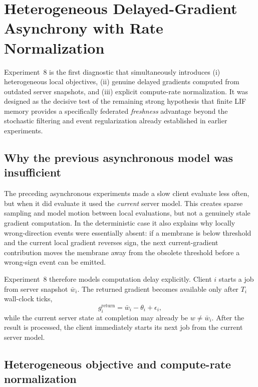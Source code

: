\section{Heterogeneous Delayed-Gradient Asynchrony with Rate Normalization}

Experiment~8 is the first diagnostic that simultaneously introduces (i) heterogeneous local objectives, (ii) genuine delayed gradients computed from outdated server snapshots, and (iii) explicit compute-rate normalization. It was designed as the decisive test of the remaining strong hypothesis that finite LIF memory provides a specifically federated \emph{freshness} advantage beyond the stochastic filtering and event regularization already established in earlier experiments.

\subsection{Why the previous asynchronous model was insufficient}

The preceding asynchronous experiments made a slow client evaluate less often, but when it did evaluate it used the \emph{current} server model. This creates sparse sampling and model motion between local evaluations, but not a genuinely stale gradient computation. In the deterministic case it also explains why locally wrong-direction events were essentially absent: if a membrane is below threshold and the current local gradient reverses sign, the next current-gradient contribution moves the membrane away from the obsolete threshold before a wrong-sign event can be emitted.

Experiment~8 therefore models computation delay explicitly. Client $i$ starts a job from server snapshot $\bar w_i$. The returned gradient becomes available only after $T_i$ wall-clock ticks,
\begin{equation}
  g_i^{\mathrm{return}} = \bar w_i-\theta_i+\epsilon_i,
\end{equation}
while the current server state at completion may already be $w\neq\bar w_i$. After the result is processed, the client immediately starts its next job from the current server model.

\subsection{Heterogeneous objective and compute-rate normalization}

